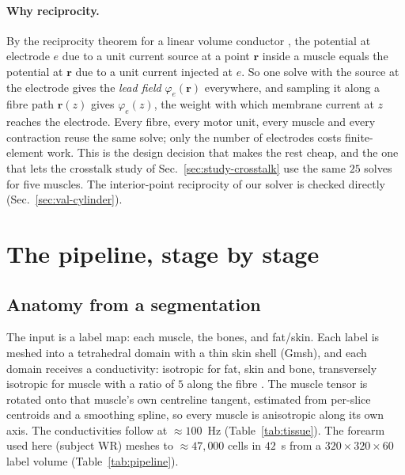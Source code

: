 \documentclass[11pt,a4paper]{article}
\begin{document}
\begin{table}[tbp]
\centering\footnotesize
\caption{One cold run of the pipeline from the committed forearm segmentation to
interference EMG on the grid (subject WR, FCU, $5\times5$ grid, $100$ units, two worker
processes on a desktop CPU shared with other jobs): what each stage does, its input and
output sizes and its wall time. The finite-element work (mesh, tensors, $25$ lead
fields) is done in under a minute and once; the recipe's monopole fits and the MUAP
synthesis are per electrode--fibre pair and per unit and dominate; a contraction costs
seconds.}
\label{tab:pipeline}
\end{table}

\paragraph{Why reciprocity.} By the reciprocity theorem for a linear volume conductor
\citep{malmivuo1995bioelectromagnetism}, the potential at electrode $e$ due to a unit
current source at a point $\mathbf{r}$ inside a muscle equals the potential at
$\mathbf{r}$ due to a unit current injected at $e$. So one solve with the source at the
electrode gives the \emph{lead field} $\varphi_e(\mathbf{r})$ everywhere, and sampling it
along a fibre path $\mathbf{r}(z)$ gives $\varphi_e(z)$, the weight with which membrane
current at $z$ reaches the electrode. Every fibre, every motor unit, every muscle and
every contraction reuse the same solve; only the number of electrodes costs finite-element
work. This is the design decision that makes the rest cheap, and the one that lets the
crosstalk study of Sec.~\ref{sec:study-crosstalk} use the same $25$ solves for five
muscles. The interior-point reciprocity of our solver is checked directly
(Sec.~\ref{sec:val-cylinder}).

\section{The pipeline, stage by stage}
\label{sec:steps}

\subsection{Anatomy from a segmentation}
\label{sec:anatomy}
The input is a label map: each muscle, the bones, and fat/skin. Each label is meshed
into a tetrahedral domain with a thin skin shell (Gmsh), and each domain receives a
conductivity: isotropic for fat, skin and bone, transversely isotropic for muscle with a
ratio of $5$ along the fibre \citep{gielen1984electrical, rush1963resistivity}. The muscle
tensor is rotated onto that muscle's own centreline tangent, estimated from per-slice
centroids and a smoothing spline, so every muscle is anisotropic along its own axis. The
conductivities follow \citet{gabriel1996dielectric} at $\approx100$~Hz
(Table~\ref{tab:tissue}). The forearm used here (subject WR) meshes to $\approx47{,}000$ cells in $42$~s from a
$320\times320\times60$ label volume (Table~\ref{tab:pipeline}).
\end{document}
